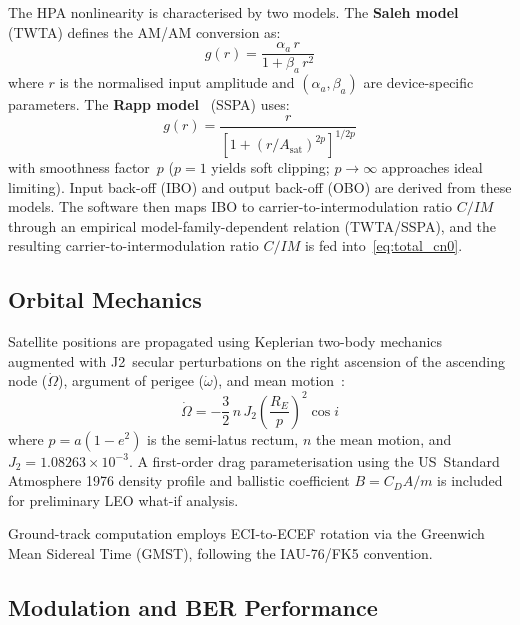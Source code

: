 \documentclass[telecom,article,submit,pdftex,moreauthors]{Definitions/mdpi}
\begin{document}
The HPA nonlinearity is characterised by two models.  The \textbf{Saleh
model}~\cite{saleh1981} (TWTA) defines the AM/AM conversion as:
\begin{equation}
  g(r) = \frac{\alpha_a\, r}{1 + \beta_a\, r^2}
  \label{eq:saleh}
\end{equation}
where $r$ is the normalised input amplitude and $(\alpha_a, \beta_a)$
are device-specific parameters.  The \textbf{Rapp model}~\cite{rapp1991}
(SSPA) uses:
\begin{equation}
  g(r) = \frac{r}{\left[1 + \left(r/A_\text{sat}\right)^{\!2p}\right]^{1/2p}}
  \label{eq:rapp}
\end{equation}
with smoothness factor~$p$ ($p=1$ yields soft clipping; $p \to \infty$
approaches ideal limiting).  Input back-off (IBO) and output back-off
(OBO) are derived from these models.  The software then maps IBO to
carrier-to-intermodulation ratio $C/IM$ through an empirical
model-family-dependent relation (TWTA/SSPA), and the resulting
carrier-to-intermodulation ratio $C/IM$ is fed into~\eqref{eq:total_cn0}.

\subsection{Orbital Mechanics}

Satellite positions are propagated using Keplerian two-body mechanics
augmented with J2~secular perturbations on the right ascension of the
ascending node ($\dot{\Omega}$), argument of perigee ($\dot{\omega}$),
and mean motion~\cite{vallado2013}:
\begin{equation}
  \dot{\Omega} = -\frac{3}{2}\,n\,J_2\!\left(\frac{R_E}{p}\right)^{\!2}
                  \cos i
  \label{eq:raan_dot}
\end{equation}
where $p = a(1-e^2)$ is the semi-latus rectum, $n$ the mean motion, and
$J_2 = 1.08263 \times 10^{-3}$.  A first-order drag parameterisation
using the US~Standard Atmosphere 1976 density profile and ballistic
coefficient $B = C_D A/m$ is included for preliminary LEO what-if
analysis.

Ground-track computation employs ECI-to-ECEF rotation via the Greenwich
Mean Sidereal Time (GMST), following the IAU-76/FK5 convention.

\subsection{Modulation and BER Performance}
\end{document}
